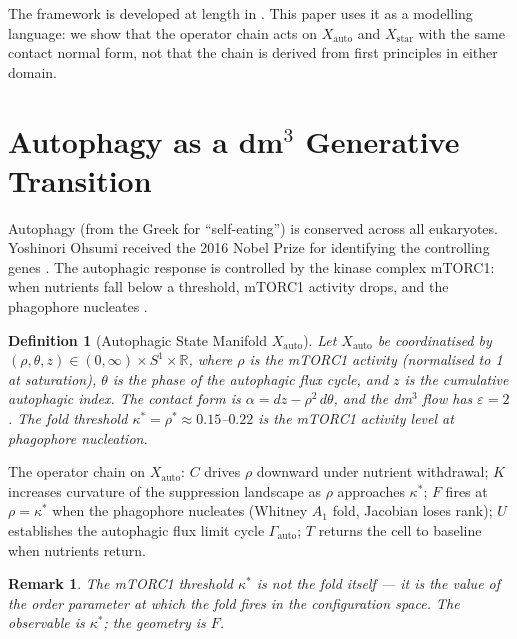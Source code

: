 \documentclass[12pt,a4paper]{article}
\newtheorem{definition}{Definition}[section]
\newtheorem{remark}{Remark}
\begin{document}
The framework is developed at length in \cite{Grossi2026_Vol1}.
This paper uses it as a modelling language: we show that the operator
chain acts on $X_\mathrm{auto}$ and $X_\mathrm{star}$ with the same
contact normal form, not that the chain is derived from first principles
in either domain.

\section{Autophagy as a dm$^3$ Generative Transition}
\label{sec:auto}

Autophagy (from the Greek for ``self-eating'') is conserved across
all eukaryotes.
Yoshinori Ohsumi received the 2016 Nobel Prize for identifying the
controlling genes \cite{Ohsumi2016}.
The autophagic response is controlled by the kinase complex mTORC1:
when nutrients fall below a threshold, mTORC1 activity drops, and the
phagophore nucleates \cite{Mizushima2010, Melia2020}.

\begin{definition}[Autophagic State Manifold $X_\mathrm{auto}$]
\label{def:xauto}
Let $X_\mathrm{auto}$ be coordinatised by $(\rho, \theta, z) \in
(0,\infty) \times S^1 \times \mathbb{R}$, where $\rho$ is the mTORC1
activity (normalised to 1 at saturation), $\theta$ is the phase of the
autophagic flux cycle, and $z$ is the cumulative autophagic index.
The contact form is $\alpha = dz - \rho^2\,d\theta$, and the dm$^3$
flow has $\varepsilon = 2$.
The fold threshold $\kappa^* = \rho^* \approx 0.15$--$0.22$ is the
mTORC1 activity level at phagophore nucleation.
\end{definition}

The operator chain on $X_\mathrm{auto}$:
$C$ drives $\rho$ downward under nutrient withdrawal;
$K$ increases curvature of the suppression landscape as $\rho$ approaches
$\kappa^*$;
$F$ fires at $\rho = \kappa^*$ when the phagophore nucleates
(Whitney $A_1$ fold, Jacobian loses rank);
$U$ establishes the autophagic flux limit cycle $\Gamma_\mathrm{auto}$;
$T$ returns the cell to baseline when nutrients return.

\begin{remark}
The mTORC1 threshold $\kappa^*$ is not the fold itself --- it is the
value of the order parameter at which the fold fires in the
configuration space.
The observable is $\kappa^*$; the geometry is $F$.
\end{remark}
\end{document}
